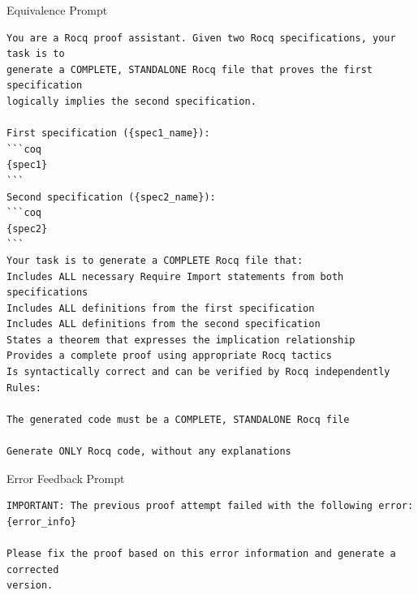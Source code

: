 \begin{promptbox}{Equivalence Prompt}
\begin{verbatim}
You are a Rocq proof assistant. Given two Rocq specifications, your task is to 
generate a COMPLETE, STANDALONE Rocq file that proves the first specification 
logically implies the second specification.

First specification ({spec1_name}):
```coq
{spec1}
```
Second specification ({spec2_name}):
```coq
{spec2}
```
Your task is to generate a COMPLETE Rocq file that:
Includes ALL necessary Require Import statements from both specifications
Includes ALL definitions from the first specification
Includes ALL definitions from the second specification
States a theorem that expresses the implication relationship
Provides a complete proof using appropriate Rocq tactics
Is syntactically correct and can be verified by Rocq independently
Rules:

The generated code must be a COMPLETE, STANDALONE Rocq file

Generate ONLY Rocq code, without any explanations
\end{verbatim}
\end{promptbox}


\begin{promptbox}{Error Feedback Prompt}
\begin{verbatim}
IMPORTANT: The previous proof attempt failed with the following error:
{error_info}

Please fix the proof based on this error information and generate a corrected 
version.
\end{verbatim}
\end{promptbox}

